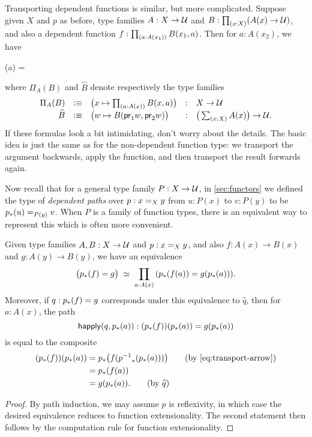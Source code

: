%
Transporting dependent functions is similar, but more complicated.
Suppose given $X$ and $p$ as before, type families $A:X\to \type$ and $B:\prd{x:X} (A(x)\to\type)$, and also a dependent function $f : \prd{a:A(x_1)} B(x_1,a)$.
Then for $a:A(x_2)$, we have
\begin{narrowmultline*}
  (a) = \narrowbreak
\end{narrowmultline*}
where $\Pi_A(B)$ and $\widehat{B}$ denote respectively the type families
\begin{equation}\label{eq:transport-arrow-families}
\begin{array}{rclcl}
\Pi_A(B) &\defeq& \big(x\mapsto \prd{a:A(x)} B(x,a) \big) &:& X\to \type\\
\widehat{B} &\defeq& \big(w \mapsto B(\proj1w,\proj2w) \big) &:& \big(\sm{x:X} A(x)\big) \to \type.
\end{array}
\end{equation}
If these formulas look a bit intimidating, don't worry about the details.
The basic idea is just the same as for the non-dependent function type: we transport the argument backwards, apply the function, and then transport the result forwards again.

Now recall that for a general type family $P:X\to\type$, in \autoref{sec:functors} we defined the type of \emph{dependent paths} over $p:\id[X]xy$ from $u:P(x)$ to $v:P(y)$ to be $\id[P(y)]{\trans{p}{u}}{v}$.
When $P$ is a family of function types, there is an equivalent way to represent this which is often more convenient.

\begin{lem}\label{thm:dpath-arrow}
  Given type families $A,B:X\to\type$ and $p:\id[X]xy$, and also $f:A(x)\to B(x)$ and $g:A(y)\to B(y)$, we have an equivalence
  \[ \eqvspaced{ \big(\trans{p}{f} = {g}\big) } { \prd{a:A(x)}  (\trans{p}{f(a)} = g(\trans{p}{a})) }. \]
  Moreover, if $q:\trans{p}{f} = {g}$ corresponds under this equivalence to $\widehat q$, then for $a:A(x)$, the path
  \[ \happly(q,\trans p a) : (\trans p f)(\trans p a) = g(\trans p a)\]
  is equal to the composite
  \begin{align*}
    (\trans p f)(\trans p a)
    &= \trans p {f (\trans {\opp p}{\trans p a})}
    \tag{by~\eqref{eq:transport-arrow}}\\
    &= \trans p {f(a)}\\
    &= g(\trans p a).
    \tag{by $\widehat{q}$}
  \end{align*}
\end{lem}
\begin{proof}
  By path induction, we may assume $p$ is reflexivity, in which case the desired equivalence reduces to function extensionality.
  The second statement then follows by the computation rule for function extensionality.
\end{proof}


